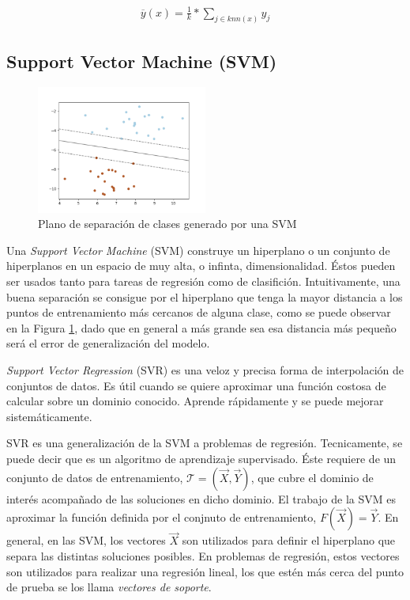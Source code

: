     \begin{align}
      \overline{y}(x) = \frac{1}{k} * \sum_{j \in knn(x)} y_{j}
    \end{align}



\subsection{Support Vector Machine (SVM)}

  \begin{figure}
  \centering%
  \includegraphics[width=0.5\textwidth]{images/svm_hiperplane}%
  \caption{Plano de separación de clases generado por una SVM}\label{fig:svm}
  \end{figure}

  \par Una \textit{Support Vector Machine} (SVM) \cite{first_svm} construye un
    hiperplano o un conjunto de hiperplanos en un espacio
    de muy alta, o infinta, dimensionalidad. Éstos pueden ser usados tanto para
    tareas de regresión como de clasifición. Intuitivamente, una buena separación
    se consigue por el hiperplano que tenga la mayor distancia a los puntos de
    entrenamiento más cercanos de alguna clase, como se puede observar en la
    Figura \ref{fig:svm}, dado que en general
    a más grande sea esa distancia más pequeño será el error de generalización del
    modelo.

  \par \textit{Support Vector Regression} (SVR)\cite{support_vector_regression, review_svr}
    es una veloz y precisa forma de interpolación de conjuntos de datos.
    Es útil cuando se quiere aproximar una función costosa de calcular sobre un
    dominio conocido. Aprende rápidamente y se puede mejorar sistemáticamente.

  \par SVR es una generalización de la SVM a problemas de regresión. Tecnicamente,
    se puede decir que es un algoritmo de aprendizaje supervisado. Éste
    requiere de un conjunto de datos de entrenamiento,
    $\mathcal{T} = (\vec{X}, \vec{Y})$, que cubre el dominio de interés acompañado
    de las soluciones en dicho dominio. El trabajo de la SVM es aproximar la función
    definida por el conjnuto de entrenamiento, $F(\vec{X}) = \vec{Y}$. En general,
    en las SVM, los vectores $\vec{X}$ son utilizados para definir el hiperplano que
    separa las distintas soluciones posibles. En problemas de regresión, estos
    vectores son utilizados para realizar una regresión lineal, los que estén
    más cerca del punto de prueba se los llama \textit{vectores de soporte}.

